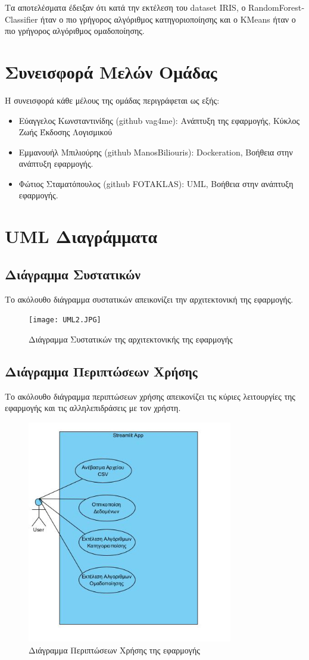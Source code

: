 \documentclass[a4paper,12pt]{article}
\begin{document}
Τα αποτελέσματα έδειξαν ότι κατά την εκτέλεση του dataset \textlatin{IRIS}, ο \textlatin{RandomForestClassifier} ήταν ο πιο γρήγορος αλγόριθμος κατηγοριοποίησης και ο \textlatin{KMeans} ήταν ο πιο γρήγορος αλγόριθμος ομαδοποίησης.

\section{Συνεισφορά Μελών Ομάδας}
\label{sec:contribution}
Η συνεισφορά κάθε μέλους της ομάδας περιγράφεται ως εξής:
\begin{itemize}
    \item Εύαγγελος Κωνσταντινίδης \textlatin{(github vag4me)}: Ανάπτυξη της εφαρμογής, Κύκλος Ζωής Έκδοσης Λογισμικού
    \item Εμμανουήλ Μπιλιούρης \textlatin{(github ManosBiliouris)}: Dockeration, Βοήθεια στην ανάπτυξη εφαρμογής.
    \item Φώτιος Σταματόπουλος \textlatin{(github FOTAKLAS)}: UML, Βοήθεια στην ανάπτυξη εφαρμογής.
\end{itemize}

\section{UML Διαγράμματα}
\label{sec:uml}

\subsection{Διάγραμμα Συστατικών}
Το ακόλουθο διάγραμμα συστατικών απεικονίζει την αρχιτεκτονική της εφαρμογής.

\begin{figure}[h!]
\centering
\texttt{[image: UML2.JPG]}
\caption{Διάγραμμα Συστατικών της αρχιτεκτονικής της εφαρμογής}
\label{fig:component}
\end{figure}

\subsection{Διάγραμμα Περιπτώσεων Χρήσης}
Το ακόλουθο διάγραμμα περιπτώσεων χρήσης απεικονίζει τις κύριες λειτουργίες της εφαρμογής και τις αλληλεπιδράσεις με τον χρήστη.

\begin{figure}[h!]
\centering
\includegraphics[width=0.8\textwidth]{UML1.JPG}
\caption{Διάγραμμα Περιπτώσεων Χρήσης της εφαρμογής}
\label{fig:usecase}
\end{figure}
\end{document}
